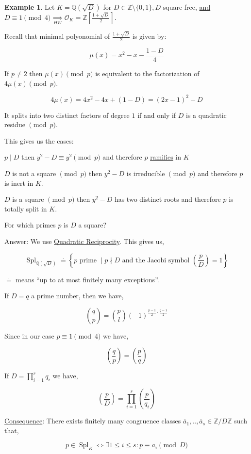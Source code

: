 \documentclass[openany]{amsbook}
\numberwithin{section}{chapter}
\theoremstyle{definition}
\newtheorem*{example}{Example}
\begin{document}
\begin{example}
    Let \(K = \mathbb{Q} (\sqrt{D})\) for \(D \in \mathbb{Z} \setminus \{ 0,1 \}, D\) square-free, \underline{and} \(D \equiv 1\pmod 4 \underset{HW}{\implies} \mathcal{O}_K = \mathbb{Z} \left[ \frac{1+\sqrt{D}}{2} \right]  \). 

    Recall that minimal polyonomial of \(\frac{1+\sqrt{D}}{2}\) is given by:

    \[
        \mu (x) = x^2 - x- \frac{1-D}{4}
    \]

    If \(p \neq 2\) then \(\mu(x) \pmod p\) is equivalent to the factorization of \(4 \mu(x) \pmod p\).
    
    \[
        4 \mu(x) =4x^2 -4x + (1-D) = (2x-1)^2 - D
    \]

    It splits into two distinct factors of degree \(1\) if and only if \(D\) is a quadratic residue \(\pmod p\).

    This gives us the cases:

    \(p \mid D\) then \(y^2 - D \equiv y^2 \pmod p\) and therefore \(p\) \underline{ramifies} in \(K\) 

    \(D\) is not a square \(\pmod p\) then \(y^2 - D\) is irreducible \(\pmod p\) and therefore \(p\) is inert in \(K\).

    \(D\) is a square \(\pmod p\) then \(y^2 - D\) has two distinct roots and therefore \(p\) is totally split in \(K\).

    For which primes \(p\) is \(D\) a square?

    Answer: We use \underline{Quadratic Reciprocity}. This gives us,

    \[
        \operatorname{Spl}_{\mathbb{Q} (\sqrt{D} )} \overset{.}{=} \left\{ p \text{ prime } \mid  p\nmid D \text{ and the Jacobi symbol } \left( \frac{p}{D} \right) = 1\right\} 
    \]

    \(\overset{.}{=}\) means ``up to at most finitely many exceptions''.

    If \(D=q\) a prime number, then we have,

    \[
        \left( \frac{q}{p} \right) = \left( \frac{p}{l} \right) (-1)^{\frac{p-1}{2}\cdot\frac{q-1}{2}}
    \]

    Since in our case \(p \equiv 1 \pmod 4\) we have,

    \[
        \left( \frac{q}{p} \right) = \left( \frac{p}{q} \right) 
    \]

    If \(D = \prod_{i=1}^r q_i\) we have,

    \[
        \left( \frac{p}{D} \right) = \prod_{i=1}^r \left( \frac{p}{q_i} \right) 
    \]

    \underline{Consequence}: There exists finitely many congruence classes \(\overline{a}_1 , ..,\overline{a}_s \in \mathbb{Z} / D\mathbb{Z}\) such that, 

    \[
        p \in \operatorname{Spl}_{K} \iff \exists 1 \leq i \leq s : p \equiv a_i \pmod D
    \]

\end{example}
\end{document}
